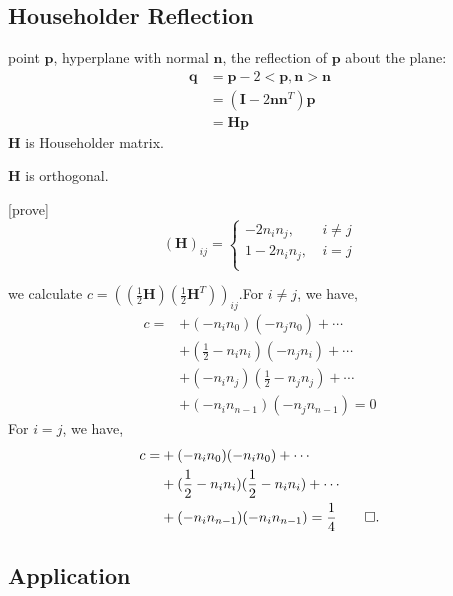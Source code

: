 \documentclass[UTF8]{../../09-Mathematics}
\begin{document}
\subsection{Householder Reflection}

point $\boldsymbol p$, hyperplane with normal  $\boldsymbol n$, the reflection of  $\boldsymbol p$ about the plane:
$$
\begin{aligned}
    \boldsymbol q &= \boldsymbol p - 2<\boldsymbol p ,\boldsymbol n >\boldsymbol n \\
    &= (\boldsymbol I -2\boldsymbol n \boldsymbol n^T )\boldsymbol p\\
    &= \boldsymbol H \boldsymbol p
\end{aligned}
$$
$\boldsymbol H$ is Householder matrix.





\begin{lemma}
    $\boldsymbol H$ is orthogonal.

    [prove]
    $$
    (\boldsymbol H)_{ij}=\left\{ 
        \begin{aligned}
        -2 n_in_j,\  & i \neq j\\
        1-2 n_in_j,\  & i = j\\
        \end{aligned}
         \right.
    $$

    we calculate $c =((\frac{1}{2}\boldsymbol H)(\frac{1}{2}\boldsymbol H^T))_{ij} $.For $i \neq j$, we have,
    $$
    \begin{aligned}
        c = &+(-n_in_0)(-n_jn_0)+\cdots\\
        &+(\frac{1}{2}-n_in_i)(-n_jn_i)+\cdots\\
        &+(-n_in_j)(\frac{1}{2}-n_jn_j)+\cdots\\
        &+(-n_in_{n-1})(-n_jn_{n-1})=0
        \end{aligned}
    $$
    For $i =j$, we have,
    $$
    \begin{aligned}
        c = &+(-n_in_0)(-n_in_0)+\cdots\\
        &+(\frac{1}{2}-n_in_i)(\frac{1}{2}-n_in_i)+\cdots\\
        &+(-n_in_{n-1})(-n_in_{n-1})=\frac{1}{4} \qed.
        \end{aligned}
    $$
\end{lemma}





\subsection{Application}
\end{document}
